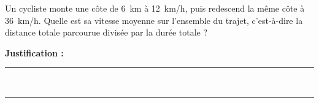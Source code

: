 Un cycliste monte une côte de \qty{6}{km} à \qty{12}{km/h}, puis redescend la même côte à \qty{36}{km/h}. Quelle est sa vitesse moyenne sur l'ensemble du trajet, c'est-à-dire la distance totale parcourue divisée par la durée totale ?

\choices

\noindent\textbf{Justification :} \hrulefill \\[2.5ex]
\rule{\linewidth}{0.4pt} \\[2.5ex]
\rule{\linewidth}{0.4pt}
\vfill
